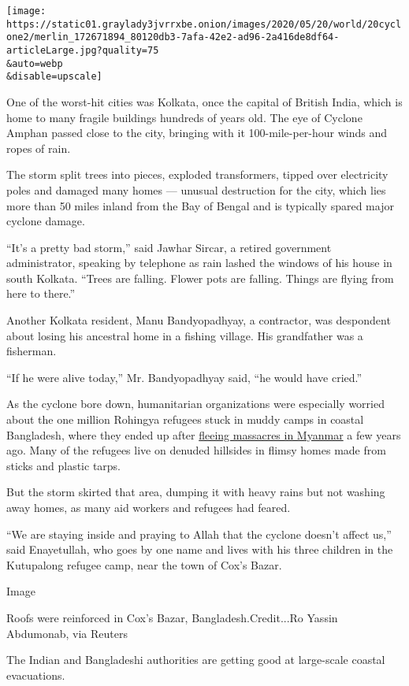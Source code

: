 \texttt{[image: https://static01.graylady3jvrrxbe.onion/images/2020/05/20/world/20cyclone2/merlin\_172671894\_80120db3-7afa-42e2-ad96-2a416de8df64-articleLarge.jpg?quality=75\\\&auto=webp\\\&disable=upscale]}

One of the worst-hit cities was Kolkata, once the capital of British
India, which is home to many fragile buildings hundreds of years old.
The eye of Cyclone Amphan passed close to the city, bringing with it
100-mile-per-hour winds and ropes of rain.

The storm split trees into pieces, exploded transformers, tipped over
electricity poles and damaged many homes --- unusual destruction for the
city, which lies more than 50 miles inland from the Bay of Bengal and is
typically spared major cyclone damage.

``It's a pretty bad storm,'' said Jawhar Sircar, a retired government
administrator, speaking by telephone as rain lashed the windows of his
house in south Kolkata. ``Trees are falling. Flower pots are falling.
Things are flying from here to there.''

Another Kolkata resident, Manu Bandyopadhyay, a contractor, was
despondent about losing his ancestral home in a fishing village. His
grandfather was a fisherman.

``If he were alive today,'' Mr. Bandyopadhyay said, ``he would have
cried.''

As the cyclone bore down, humanitarian organizations were especially
worried about the one million Rohingya refugees stuck in muddy camps in
coastal Bangladesh, where they ended up after
\href{https://www.nytimes3xbfgragh.onion/2017/10/11/world/asia/rohingya-myanmar-atrocities.html}{fleeing
massacres in Myanmar} a few years ago. Many of the refugees live on
denuded hillsides in flimsy homes made from sticks and plastic tarps.

But the storm skirted that area, dumping it with heavy rains but not
washing away homes, as many aid workers and refugees had feared.

``We are staying inside and praying to Allah that the cyclone doesn't
affect us,'' said Enayetullah, who goes by one name and lives with his
three children in the Kutupalong refugee camp, near the town of Cox's
Bazar.

Image

Roofs were reinforced in Cox's Bazar, Bangladesh.Credit...Ro Yassin
Abdumonab, via Reuters

The Indian and Bangladeshi authorities are getting good at large-scale
coastal evacuations.

